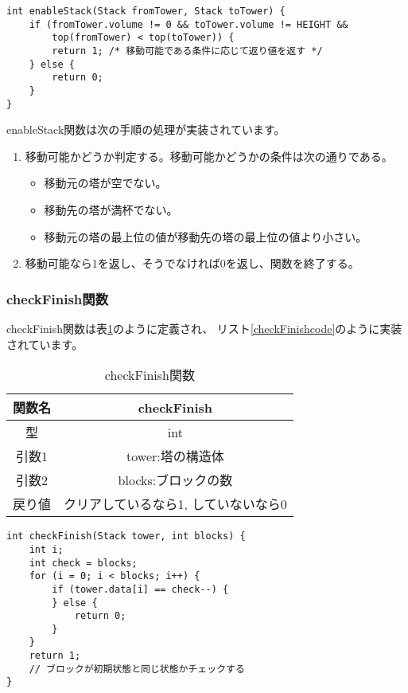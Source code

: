 \documentclass[a4j]{jarticle}
\begin{document}
\begin{lstlisting}[caption=enableStack関数,label=enableStackcode]
  int enableStack(Stack fromTower, Stack toTower) {
    if (fromTower.volume != 0 && toTower.volume != HEIGHT &&
        top(fromTower) < top(toTower)) {
        return 1; /* 移動可能である条件に応じて返り値を返す */
    } else {
        return 0;
    }
}
\end{lstlisting}

enableStack関数は次の手順の処理が実装されています。
\begin{enumerate}
  \item 移動可能かどうか判定する。移動可能かどうかの条件は次の通りである。
        \begin{itemize}
          \item 移動元の塔が空でない。
          \item 移動先の塔が満杯でない。
          \item 移動元の塔の最上位の値が移動先の塔の最上位の値より小さい。
        \end{itemize}
  \item 移動可能なら1を返し、そうでなければ0を返し、関数を終了する。
\end{enumerate}

\subsubsection{checkFinish関数}
\label{sec:checkFinish}
checkFinish関数は表\ref{tb:checkFinish}のように定義され、
リスト\ref{checkFinishcode}のように実装されています。

\begin{table}[h]
  \centering
  \caption{checkFinish関数}
  \label{tb:checkFinish}
  \begin{tabular}{|c|c|}
    \hline
    関数名 & checkFinish          \\
    \hline
    型   & int                  \\
    \hline
    引数1 & tower:塔の構造体          \\
    \hline
    引数2 & blocks:ブロックの数        \\
    \hline
    戻り値 & クリアしているなら1, していないなら0 \\
    \hline
  \end{tabular}
\end{table}

\begin{lstlisting}[caption=checkFinish関数,label=checkFinishcode]
  int checkFinish(Stack tower, int blocks) {
    int i;
    int check = blocks;
    for (i = 0; i < blocks; i++) {
        if (tower.data[i] == check--) {
        } else {
            return 0;
        }
    }
    return 1;
    // ブロックが初期状態と同じ状態かチェックする
}
\end{lstlisting}
\end{document}
